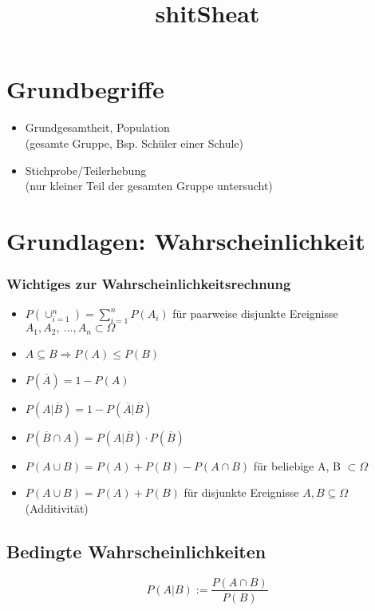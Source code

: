 \documentclass[10pt,a4paper,landscape]{article}
\title{shitSheat}
\newcommand{\setdocumentfont}{\fontsize{6}{8}\selectfont}
\begin{document}
\setdocumentfont
\begin{multicols}{4}
\noindent

\section{Grundbegriffe}

\begin{itemize}
\item Grundgesamtheit, Population\\
	(gesamte Gruppe, Bsp. Schüler einer Schule)
\item Stichprobe/Teilerhebung\\
	(nur kleiner Teil der gesamten Gruppe untersucht)
\end{itemize}




\section{Grundlagen: Wahrscheinlichkeit}

\subsubsection*{Wichtiges zur Wahrscheinlichkeitsrechnung}
\begin{itemize}
\item $P(\cup _{i=1} ^{n}) = \sum_{i=1}^n P(A_i)$ für paarweise disjunkte Ereignisse $A_1, A_2, ~..., A_n \subset \Omega$
\item $A \subseteq B \Rightarrow P(A) \leqslant P(B)$
\item \(P (\overline{A}) = 1 - P(A)\)
\item $P(A|\overline{B})= 1 - P(\overline{A} |\overline{B})$
\item $P(\overline{B}\cap A)=P(A|\overline{B})\cdot P(\overline{B})$
\item $P(A\cup B) = P(A) + P(B) -P(A\cap B)$ für beliebige A, B $\subset \Omega$
\item $P(A \cup B) = P(A) + P(B)$ für disjunkte Ereignisse $A,B \subseteq \Omega$ (Additivität)
\end{itemize}

\subsection{Bedingte Wahrscheinlichkeiten}
\[
P(A|B) := \frac{P(A\cap B)}{P(B)}
\]


\end{multicols}
\end{document}
